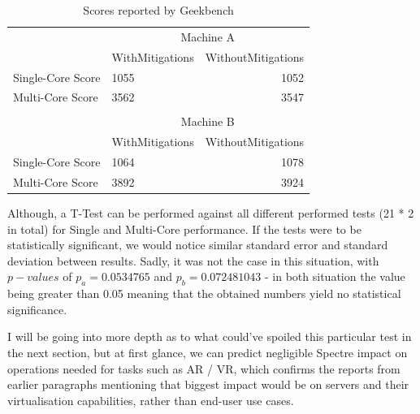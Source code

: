 \documentclass{csfourzero}
\begin{document}
\begin{table}[h]
\centering
\begin{tabular}{llr}
\cline{2-3}
\multicolumn{1}{c|}{}                   & \multicolumn{2}{c|}{Machine A}                                                 \\ \cline{2-3} 
\multicolumn{1}{l|}{}                   & \multicolumn{1}{l|}{WithMitigations} & \multicolumn{1}{r|}{WithoutMitigations} \\ \hline
\multicolumn{1}{|l|}{Single-Core Score} & \multicolumn{1}{l|}{1055}            & \multicolumn{1}{r|}{1052}               \\ \hline
\multicolumn{1}{|l|}{Multi-Core Score}  & \multicolumn{1}{l|}{3562}            & \multicolumn{1}{r|}{3547}               \\ \hline
                                        &                                      & \multicolumn{1}{l}{}                    \\ \cline{2-3} 
\multicolumn{1}{l|}{}                   & \multicolumn{2}{c|}{Machine B}                                                 \\ \cline{2-3} 
\multicolumn{1}{l|}{}                   & \multicolumn{1}{l|}{WithMitigations} & \multicolumn{1}{r|}{WithoutMitigations} \\ \hline
\multicolumn{1}{|l|}{Single-Core Score} & \multicolumn{1}{l|}{1064}            & \multicolumn{1}{r|}{1078}               \\ \hline
\multicolumn{1}{|l|}{Multi-Core Score}  & \multicolumn{1}{l|}{3892}            & \multicolumn{1}{r|}{3924}               \\ \hline
\end{tabular}
\caption{Scores reported by Geekbench}
\label{tab:geekbench}
\end{table}

Although, a T-Test can be performed against all different performed tests (21 * 2 in total) for Single and Multi-Core performance. If the tests were to be statistically significant, we would notice similar standard error and standard deviation between results. Sadly, it was not the case in this situation, with $p-values$ of $p_{a} = 0.0534765$ and $p_{b} = 0.072481043$ - in both situation the value being greater than 0.05 meaning that the obtained numbers yield no statistical significance.

I will be going into more depth as to what could've spoiled this particular test in the next section, but at first glance, we can predict negligible Spectre impact on operations needed for tasks such as AR / VR, which confirms the reports from earlier paragraphs mentioning that biggest impact would be on servers and their virtualisation capabilities, rather than end-user use cases.
\end{document}
